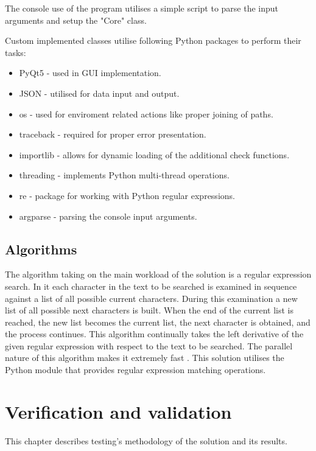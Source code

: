 \documentclass[a4paper,twoside,12pt]{book}
\begin{document}
The console use of the program utilises a simple script to parse the input arguments and setup the "Core" class.

Custom implemented classes utilise following Python packages to perform their tasks: 

\begin{itemize}
   \item PyQt5 - used in GUI implementation.
   \item JSON - utilised for data input and output.
   \item os - used for enviroment related actions like proper joining of paths.
   \item traceback - required for proper error presentation.
   \item importlib - allows for dynamic loading of the additional check functions.
   \item threading - implements Python multi-thread operations.
   \item re - package for working with Python regular expressions.
   \item argparse - parsing the console input arguments.
\end{itemize}



\section{Algorithms}

The algorithm taking on the main workload of the solution is a regular expression search. In it each character in the text to be searched is examined in sequence against a 
list of all possible current characters. During this examination a new list of all possible next characters is built. When the end of the current list is reached, the new list becomes the current list, the next 
character is obtained, and the process continues. This algorithm continually takes the left derivative of the given regular expression with respect to the text to be searched. The parallel nature of this algorithm 
makes it extremely fast \cite{bib:articleRE}. This solution utilises the Python module that provides regular expression matching operations.

\chapter{Verification and validation}

This chapter describes testing's methodology of the solution and its results.
\end{document}
